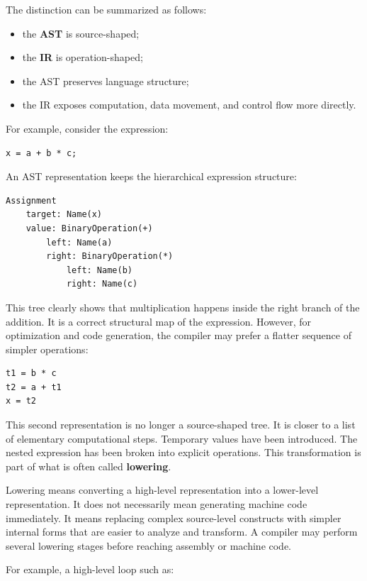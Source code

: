 The distinction can be summarized as follows:

\begin{itemize}
    \item the \textbf{AST} is source-shaped;
    \item the \textbf{IR} is operation-shaped;
    \item the AST preserves language structure;
    \item the IR exposes computation, data movement, and control flow more directly.
\end{itemize}

For example, consider the expression:

\begin{verbatim}
x = a + b * c;
\end{verbatim}

An AST representation keeps the hierarchical expression structure:

\begin{verbatim}
Assignment
    target: Name(x)
    value: BinaryOperation(+)
        left: Name(a)
        right: BinaryOperation(*)
            left: Name(b)
            right: Name(c)
\end{verbatim}

This tree clearly shows that multiplication happens inside the right branch of the addition. It is a correct structural map of the expression. However, for optimization and code generation, the compiler may prefer a flatter sequence of simpler operations:

\begin{verbatim}
t1 = b * c
t2 = a + t1
x = t2
\end{verbatim}

This second representation is no longer a source-shaped tree. It is closer to a list of elementary computational steps. Temporary values have been introduced. The nested expression has been broken into explicit operations. This transformation is part of what is often called \textbf{lowering}.

Lowering means converting a high-level representation into a lower-level representation. It does not necessarily mean generating machine code immediately. It means replacing complex source-level constructs with simpler internal forms that are easier to analyze and transform. A compiler may perform several lowering stages before reaching assembly or machine code.

For example, a high-level loop such as:

